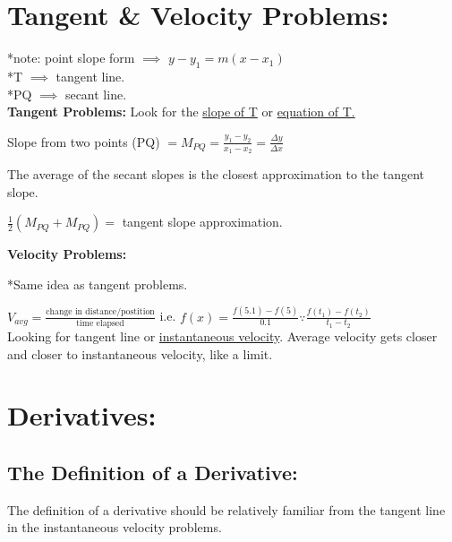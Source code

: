 \documentclass[fleqn]{article}
\begin{document}
\section*{Tangent \& Velocity Problems:}
{*note: point slope form $\implies$ $\displaystyle y-y_1 = m(x-x_1)$}
\\

*T $\implies$ tangent line.
\\

*PQ $\implies$ secant line.
\\

\textbf{Tangent Problems:}
\newline
Look for the \underline{slope of T} or \underline{equation of T.} 
\newline
\begin{center}
    Slope from two points (PQ) $\displaystyle = M_{PQ} = \frac{y_1 - y_2}{x_1 - x_2} = \frac{\Delta y}{\Delta x} $
\end{center}
The average of the secant slopes is the closest approximation to the tangent slope. 

\begin{center}
    $\displaystyle \frac{1}{2} (M_{PQ} + M_{PQ}) = $ tangent slope approximation.
\end{center}
\textbf{Velocity Problems:}

*Same idea as tangent problems.
\newline

$\displaystyle V_{avg} = \frac{\text{change in distance/postition}}{\text{time elapsed}}$ i.e. $\displaystyle f(x) = \frac{f(5.1)-f(5)}{0.1} \because \frac{f(t_1)-f(t_2)}{t_1-t_2}$
\newline
\\

Looking for tangent line or \underline{instantaneous velocity}. Average velocity gets closer and closer to instantaneous velocity, like a limit. 

\section*{Derivatives:}
\subsection*{The Definition of a Derivative:}


The definition of a derivative should be relatively familiar from the tangent line in the instantaneous velocity problems. 
\newline
\end{document}
